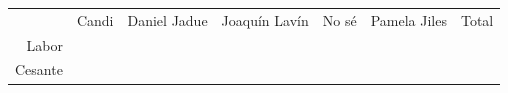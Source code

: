 \documentclass[
]{article}
\begin{document}
\begin{longtable}[]{@{}rrrrrrr@{}}
\toprule
\endhead
\begin{minipage}[t]{0.15\columnwidth}\raggedleft
\strut
\end{minipage} & \begin{minipage}[t]{0.05\columnwidth}\raggedleft
Candi\strut
\end{minipage} & \begin{minipage}[t]{0.12\columnwidth}\raggedleft
Daniel Jadue\strut
\end{minipage} & \begin{minipage}[t]{0.11\columnwidth}\raggedleft
Joaquín Lavín\strut
\end{minipage} & \begin{minipage}[t]{0.12\columnwidth}\raggedleft
No sé\strut
\end{minipage} & \begin{minipage}[t]{0.12\columnwidth}\raggedleft
Pamela Jiles\strut
\end{minipage} & \begin{minipage}[t]{0.12\columnwidth}\raggedleft
Total\strut
\end{minipage}\tabularnewline
\begin{minipage}[t]{0.15\columnwidth}\raggedleft
Labor\strut
\end{minipage} & \begin{minipage}[t]{0.05\columnwidth}\raggedleft
\strut
\end{minipage} & \begin{minipage}[t]{0.12\columnwidth}\raggedleft
\strut
\end{minipage} & \begin{minipage}[t]{0.11\columnwidth}\raggedleft
\strut
\end{minipage} & \begin{minipage}[t]{0.12\columnwidth}\raggedleft
\strut
\end{minipage} & \begin{minipage}[t]{0.12\columnwidth}\raggedleft
\strut
\end{minipage} & \begin{minipage}[t]{0.12\columnwidth}\raggedleft
\strut
\end{minipage}\tabularnewline
\begin{minipage}[t]{0.15\columnwidth}\raggedleft
Cesante\strut
\end{minipage} & \begin{minipage}[t]{0.05\columnwidth}\raggedleft
\strut
\end{minipage} & \begin{minipage}[t]{0.12\columnwidth}\raggedleft

\end{minipage}
\end{longtable}
\end{document}

